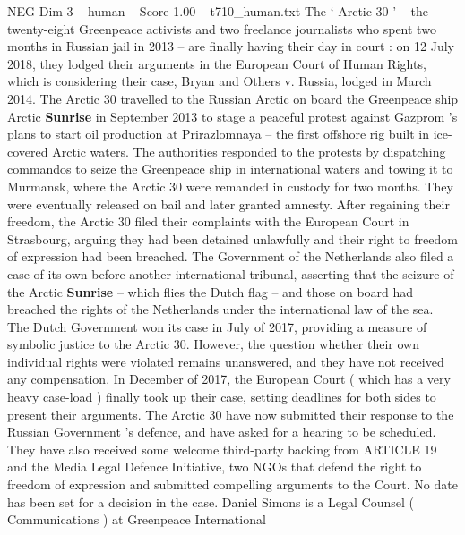 \begin{textsample}{NEG Dim 3 – human – Score 1.00 – t710\_human.txt}  \label{ex:f3_neg_045}
The ‘ Arctic 30 ’ – the twenty-eight Greenpeace activists and two freelance journalists who spent two months in Russian jail in 2013 – are finally having their day in court : on 12 July 2018, they lodged their arguments in the European Court of Human Rights, which is considering their case, Bryan and Others v.
Russia, lodged in March 2014.
The Arctic 30 travelled to the Russian Arctic on board the Greenpeace ship Arctic \textbf{Sunrise} in September 2013 to stage a peaceful protest against Gazprom ’s plans to start oil production at Prirazlomnaya – the first offshore rig built in ice-covered Arctic waters.
The authorities responded to the protests by dispatching commandos to seize the Greenpeace ship in international waters and towing it to Murmansk, where the Arctic 30 were remanded in custody for two months.
They were eventually released on bail and later granted amnesty.
After regaining their freedom, the Arctic 30 filed their complaints with the European Court in Strasbourg, arguing they had been detained unlawfully and their right to freedom of expression had been breached.
The Government of the Netherlands also filed a case of its own before another international tribunal, asserting that the seizure of the Arctic \textbf{Sunrise} – which flies the Dutch flag – and those on board had breached the rights of the Netherlands under the international law of the sea.
The Dutch Government won its case in July of 2017, providing a measure of symbolic justice to the Arctic 30.
However, the question whether their own individual rights were violated remains unanswered, and they have not received any compensation.
In December of 2017, the European Court ( which has a very heavy case-load ) finally took up their case, setting deadlines for both sides to present their arguments.
The Arctic 30 have now submitted their response to the Russian Government ’s defence, and have asked for a hearing to be scheduled.
They have also received some welcome third-party backing from ARTICLE 19 and the Media Legal Defence Initiative, two NGOs that defend the right to freedom of expression and submitted compelling arguments to the Court.
No date has been set for a decision in the case.
Daniel Simons is a Legal Counsel ( Communications ) at Greenpeace International

\end{textsample}

